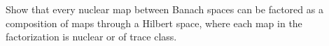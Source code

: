 Show that every nuclear map between Banach spaces can be factored as a composition of maps through a Hilbert space, where each map in the factorization is nuclear or of trace class.
